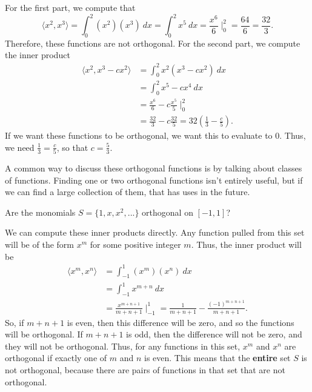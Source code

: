 \begin{exampleSol}
For the first part, we compute that
\[ \langle x^2, x^3 \rangle = \int_0^2 (x^2)(x^3)\ dx = \int_0^2 x^5\ dx = \frac{x^6}{6}\mid_0^2 = \frac{64}{6} = \frac{32}{3}. \] Therefore, these functions are not orthogonal. For the second part, we compute the inner product
\[ \begin{split}
\langle x^2, x^3 - cx^2 \rangle &= \int_0^2 x^2(x^3 - cx^2)\ dx \\
&= \int_0^2 x^5 - cx^4\ dx \\
&= \frac{x^6}{6} - c\frac{x^5}{5} \mid_0^2 \\
&= \frac{32}{3} - c\frac{32}{5} = 32\left(\frac{1}{3} - \frac{c}{5} \right).
\end{split} \]
If we want these functions to be orthogonal, we want this to evaluate to $0$. Thus, we need $\frac{1}{3} = \frac{c}{5}$, so that $c = \frac{5}{3}$. 
\end{exampleSol}

A common way to discuss these orthogonal functions is by talking about classes of functions. Finding one or two orthogonal functions isn't entirely useful, but if we can find a large collection of them, that has uses in the future.

\begin{example}
Are the monomials $S = \{1, x, x^2, ...\}$ orthogonal on $[-1,1]$?
\end{example}

\begin{exampleSol}
We can compute these inner products directly. Any function pulled from this set will be of the form $x^m$ for some positive integer $m$. Thus, the inner product will be
\[ \begin{split}
\langle x^m, x^n \rangle &= \int_{-1}^1 (x^m)(x^n)\ dx \\
&= \int_{-1}^1 x^{m+n}\ dx \\
&= \frac{x^{m+n+1}}{m+n+1}\mid_{-1}^1 = \frac{1}{m+n+1} - \frac{(-1)^{m+n+1}}{m+n+1}.
\end{split} \]
So, if $m+n+1$ is even, then this difference will be zero, and so the functions will be orthogonal. If $m+n+1$ is odd, then the difference will not be zero, and they will not be orthogonal. Thus, for any functions in this set, $x^m$ and $x^n$ are orthogonal if exactly one of $m$ and $n$ is even. This means that the \textbf{entire} set $S$ is not orthogonal, because there are pairs of functions in that set that are not orthogonal.
\end{exampleSol}

